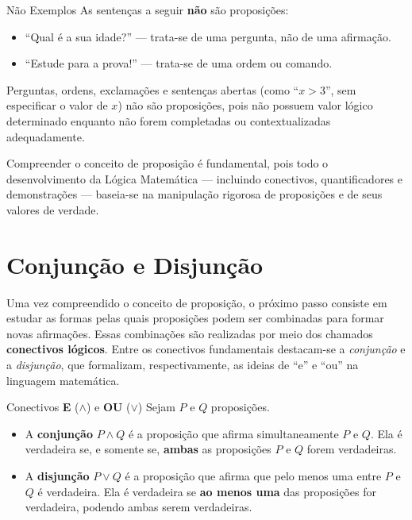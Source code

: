 \documentclass[12pt,a4paper,openright]{book}
\begin{document}
\begin{block}{Não Exemplos}
As sentenças a seguir \textbf{não} são proposições:
\begin{itemize}
    \item “Qual é a sua idade?” — trata-se de uma pergunta, não de uma afirmação.
    \item “Estude para a prova!” — trata-se de uma ordem ou comando.
\end{itemize}
\end{block}

Perguntas, ordens, exclamações e sentenças abertas (como “$x > 3$”, sem especificar o valor de $x$) não são proposições, pois não possuem valor lógico determinado enquanto não forem completadas ou contextualizadas adequadamente.

Compreender o conceito de proposição é fundamental, pois todo o desenvolvimento da Lógica Matemática — incluindo conectivos, quantificadores e demonstrações — baseia-se na manipulação rigorosa de proposições e de seus valores de verdade.
\section{Conjunção e Disjunção}

Uma vez compreendido o conceito de proposição, o próximo passo consiste em estudar as formas pelas quais proposições podem ser combinadas para formar novas afirmações. Essas combinações são realizadas por meio dos chamados \textbf{conectivos lógicos}. Entre os conectivos fundamentais destacam-se a \emph{conjunção} e a \emph{disjunção}, que formalizam, respectivamente, as ideias de “e” e “ou” na linguagem matemática.

\begin{block}{Conectivos \textbf{E} ($\land$) e \textbf{OU} ($\lor$)}
Sejam \(P\) e \(Q\) proposições.

\begin{itemize}
    \item A \textbf{conjunção} \(P \land Q\) é a proposição que afirma simultaneamente \(P\) e \(Q\). Ela é verdadeira se, e somente se, \textbf{ambas} as proposições \(P\) e \(Q\) forem verdadeiras.
    
    \item A \textbf{disjunção} \(P \lor Q\) é a proposição que afirma que pelo menos uma entre \(P\) e \(Q\) é verdadeira. Ela é verdadeira se \textbf{ao menos uma} das proposições for verdadeira, podendo ambas serem verdadeiras.
\end{itemize}
\end{block}
\end{document}
